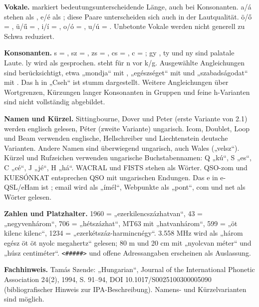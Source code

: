 \documentclass[a4paper,landscape,10pt]{article}
\newcommand{\ipa}[1]{{\ipafont[#1]}}
\begin{document}
\smallskip
\textbf{Vokale.} \ipa{ː} markiert bedeutungsunterscheidende Länge, auch bei Konsonanten.
a/á stehen als \ipa{ɒ/aː}, e/é als \ipa{ɛ/eː}; diese Paare unterscheiden sich auch in der Lautqualität.
ö/ő = \ipa{ø/øː}, ü/ű = \ipa{y/yː}, i/í = \ipa{i/iː}, o/ó = \ipa{o/oː}, u/ú = \ipa{u/uː}.
Unbetonte Vokale werden nicht generell zu Schwa reduziert.

\smallskip
\textbf{Konsonanten.} s = \ipa{ʃ}, sz = \ipa{s}, zs = \ipa{ʒ}, cs = \ipa{tʃ}, c = \ipa{ts};
gy \ipa{ɟ}, ty \ipa{c} und ny \ipa{ɲ} sind palatale Laute. ly wird als \ipa{j} gesprochen.
\ipa{ŋ} steht für n vor k/g. Ausgewählte Angleichungen sind berücksichtigt, etwa „mondja“ mit \ipa{ɟː},
„egészséget“ mit \ipa{ʃː} und „szabadságodat“ mit \ipa{tʃː}. Das h in „Cseh“ ist stumm dargestellt.
Weitere Angleichungen über Wortgrenzen, Kürzungen langer Konsonanten in Gruppen und feine h-Varianten sind nicht vollständig abgebildet.

\smallskip
\textbf{Namen und Kürzel.} Sittingbourne, Dover und Peter (erste Variante von 2.1) werden englisch gelesen,
Péter (zweite Variante) ungarisch. Icom, Doublet, Loop und Beam verwenden englische, Hellschreiber und
Liechtenstein deutsche Varianten. Andere Namen sind überwiegend ungarisch, auch Wales („velsz“).
Kürzel und Rufzeichen verwenden ungarische Buchstabennamen: Q „kú“, S „es“, C „cé“, J „jé“, H „há“.
WACRAL und FISTS stehen als Wörter. QSO-zom und KUESÓNKAT entsprechen QSO mit ungarischen Endungen.
Das e in e-QSL/eHam ist \ipa{iː}; email wird als „ímél“, Webpunkte als „pont“, com und net als Wörter gelesen.

\smallskip
\textbf{Zahlen und Platzhalter.} 1960 = „ezerkilencszázhatvan“, 43 = „negyvenhárom“, 706 = „hétszázhat“,
MT63 mit „hatvanhárom“, 599 = „öt kilenc kilenc“, 1234 = „ezerkétszáz-harmincnégy“.
3.558 MHz wird als „három egész öt öt nyolc megahertz“ gelesen; 80 m und 20 cm mit „nyolcvan méter“ und „húsz centiméter“.
\texttt{<\#\#\#\#\#>} und offene Adressangaben erscheinen als Auslassung.

\smallskip
\textbf{Fachhinweis.} Tamás Szende: „Hungarian“, Journal of the International Phonetic Association
24(2), 1994, S. 91--94, DOI 10.1017/S0025100300005090 (bibliografischer Hinweis zur IPA-Beschreibung).
Namens- und Kürzelvarianten sind möglich.
\end{document}
